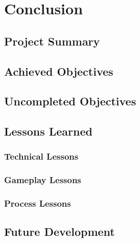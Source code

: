 \section{Conclusion}

\subsection{Project Summary}

\subsection{Achieved Objectives}

\subsection{Uncompleted Objectives}

\subsection{Lessons Learned}

\subsubsection{Technical Lessons}

\subsubsection{Gameplay Lessons}

\subsubsection{Process Lessons}

\subsection{Future Development}
